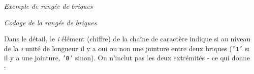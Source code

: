 \begin{center}


\textit{{Exemple de rangée de briques}}
\end{center}
\begin{center}

\textit{{Codage de la rangée de briques}}
\end{center}

Dans le détail, le \textit{i} élément (chiffre) de la chaîne de caractère indique si au niveau de la \textit{i} unité de longueur il y a oui ou non une jointure entre deux briques (\texttt{'1'} si il y a une jointure, \texttt{'0'} sinon). On n'inclut pas les deux extrémités - ce qui donne :

